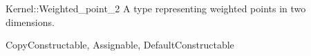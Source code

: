 \begin{ccRefConcept}{Kernel::Weighted_point_2}
A type representing weighted points in two dimensions.

\ccRefines
CopyConstructable, Assignable, DefaultConstructable

\ccSeeAlso
{} \\
 \\
 \\
 \\

\end{ccRefConcept}
